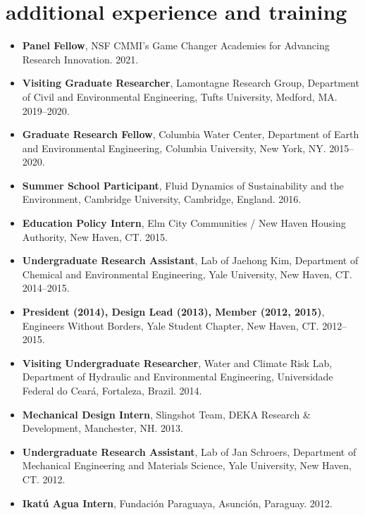 \documentclass[10pt,oneside]{article}
\begin{document}
\section{additional experience and training}

\mbox{}\vspace{-\dimexpr\baselineskip\relax}

\begin{itemize}[label={}]
  
  \item \textbf{Panel Fellow}, NSF CMMI's Game Changer Academies for Advancing Research Innovation. 2021.
  
  \item \textbf{Visiting Graduate Researcher}, Lamontagne Research Group, Department of Civil and Environmental Engineering, Tufts University, Medford, MA. 2019--2020.
  
  \item \textbf{Graduate Research Fellow}, Columbia Water Center, Department of Earth and Environmental Engineering, Columbia University, New York, NY. 2015--2020.
  
  \item \textbf{Summer School Participant}, Fluid Dynamics of Sustainability and the Environment, Cambridge University, Cambridge, England. 2016.
  
  \item \textbf{Education Policy Intern}, Elm City Communities / New Haven Housing Authority, New Haven, CT. 2015.
  
  \item \textbf{Undergraduate Research Assistant}, Lab of Jaehong Kim, Department of Chemical and Environmental Engineering, Yale University, New Haven, CT. 2014--2015.
  
  \item \textbf{President (2014), Design Lead (2013), Member (2012, 2015)}, Engineers Without Borders, Yale Student Chapter, New Haven, CT. 2012--2015.
  
  \item \textbf{Visiting Undergraduate Researcher}, Water and Climate Risk Lab, Department of Hydraulic and Environmental Engineering, Universidade Federal do Ceará, Fortaleza, Brazil. 2014.
  
  \item \textbf{Mechanical Design Intern}, Slingshot Team, DEKA Research \& Development, Manchester, NH. 2013.
  
  \item \textbf{Undergraduate Research Assistant}, Lab of Jan Schroers, Department of Mechanical Engineering and Materials Science, Yale University, New Haven, CT. 2012.
  
  \item \textbf{Ikatú Agua Intern}, Fundación Paraguaya, Asunción, Paraguay. 2012.
  
\end{itemize}
\end{document}
